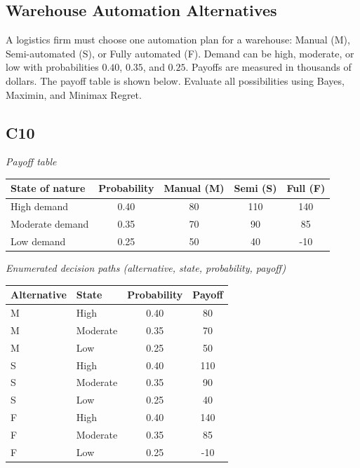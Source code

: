 \begin{ExamProblems}
		\item
		\subsection*{Warehouse Automation Alternatives}
		A logistics firm must choose one automation plan for a warehouse: Manual (M), Semi-automated (S), or Fully automated (F).
		Demand can be high, moderate, or low with probabilities $0.40$, $0.35$, and $0.25$. Payoffs are measured in thousands of dollars.
		The payoff table is shown below. Evaluate all possibilities using Bayes, Maximin, and Minimax Regret.
		
		\subsection*{C10}
		\begin{center}
			\textit{Payoff table} \\
			\begin{tabular}{l c c c c}
				\toprule
				State of nature & Probability & Manual (M) & Semi (S) & Full (F) \\
				\midrule
				High demand & 0.40 & 80 & 110 & 140 \\
				Moderate demand & 0.35 & 70 & 90 & 85 \\
				Low demand & 0.25 & 50 & 40 & -10 \\
				\bottomrule
			\end{tabular}
		\end{center}
		
		\textit{Enumerated decision paths (alternative, state, probability, payoff)}
		\begin{center}
			\begin{tabular}{l l c c}
				\toprule
				Alternative & State & Probability & Payoff \\
				\midrule
				M & High & 0.40 & 80 \\
				M & Moderate & 0.35 & 70 \\
				M & Low & 0.25 & 50 \\
				S & High & 0.40 & 110 \\
				S & Moderate & 0.35 & 90 \\
				S & Low & 0.25 & 40 \\
				F & High & 0.40 & 140 \\
				F & Moderate & 0.35 & 85 \\
				F & Low & 0.25 & -10 \\
				\bottomrule
			\end{tabular}
		\end{center}
		

\end{ExamProblems}
